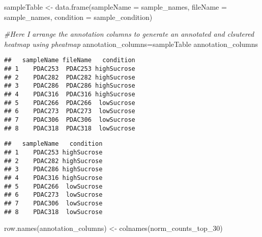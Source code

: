 \documentclass[
]{article}
\newenvironment{Shaded}{\begin{snugshade}}{\end{snugshade}}
\newcommand{\AttributeTok}[1]{\textcolor[rgb]{0.77,0.63,0.00}{#1}}
\newcommand{\CommentTok}[1]{\textcolor[rgb]{0.56,0.35,0.01}{\textit{#1}}}
\newcommand{\ConstantTok}[1]{\textcolor[rgb]{0.00,0.00,0.00}{#1}}
\newcommand{\FunctionTok}[1]{\textcolor[rgb]{0.00,0.00,0.00}{#1}}
\newcommand{\NormalTok}[1]{#1}
\newcommand{\OtherTok}[1]{\textcolor[rgb]{0.56,0.35,0.01}{#1}}
\newcommand{\SpecialCharTok}[1]{\textcolor[rgb]{0.00,0.00,0.00}{#1}}
\begin{document}
\begin{Shaded}
\begin{Highlighting}[]
\NormalTok{sampleTable }\OtherTok{\textless{}{-}} \FunctionTok{data.frame}\NormalTok{(}\AttributeTok{sampleName =}\NormalTok{ sample\_names,}
                          \AttributeTok{fileName =}\NormalTok{ sample\_names,}
                          \AttributeTok{condition =}\NormalTok{ sample\_condition)}
\end{Highlighting}
\end{Shaded}

\begin{Shaded}
\begin{Highlighting}[]
\CommentTok{\#Here I arrange the annotation columns to generate an annotated and clsutered heatmap using pheatmap}
\NormalTok{annotation\_columns}\OtherTok{=}\NormalTok{sampleTable}
\NormalTok{annotation\_columns}
\end{Highlighting}
\end{Shaded}

\begin{verbatim}
##   sampleName fileName   condition
## 1    PDAC253  PDAC253 highSucrose
## 2    PDAC282  PDAC282 highSucrose
## 3    PDAC286  PDAC286 highSucrose
## 4    PDAC316  PDAC316 highSucrose
## 5    PDAC266  PDAC266  lowSucrose
## 6    PDAC273  PDAC273  lowSucrose
## 7    PDAC306  PDAC306  lowSucrose
## 8    PDAC318  PDAC318  lowSucrose
\end{verbatim}

\begin{Shaded}
\end{Shaded}

\begin{verbatim}
##   sampleName   condition
## 1    PDAC253 highSucrose
## 2    PDAC282 highSucrose
## 3    PDAC286 highSucrose
## 4    PDAC316 highSucrose
## 5    PDAC266  lowSucrose
## 6    PDAC273  lowSucrose
## 7    PDAC306  lowSucrose
## 8    PDAC318  lowSucrose
\end{verbatim}

\begin{Shaded}
\begin{Highlighting}[]
\FunctionTok{row.names}\NormalTok{(annotation\_columns) }\OtherTok{\textless{}{-}} \FunctionTok{colnames}\NormalTok{(norm\_counts\_top\_30)}
\end{Highlighting}
\end{Shaded}
\end{document}
